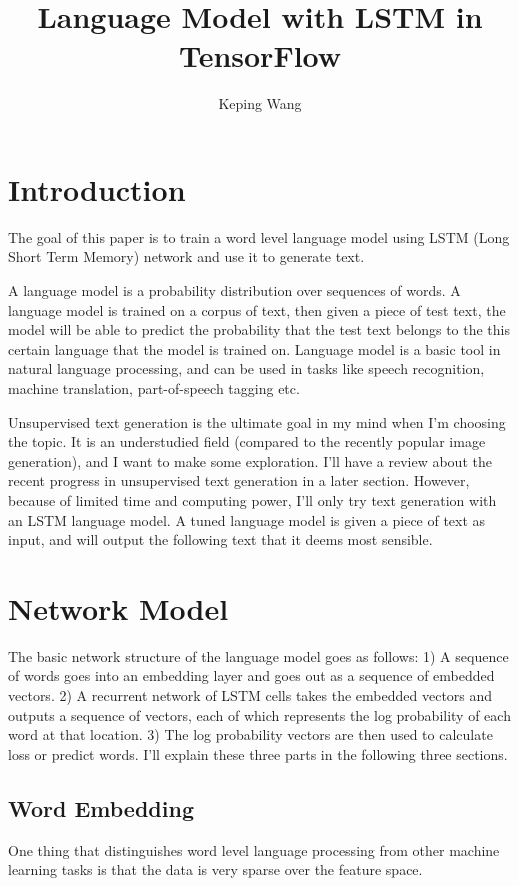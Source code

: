 \documentclass[a4paper]{article}
\title{Language Model with LSTM in TensorFlow}
\author{Keping Wang}
\begin{document}
\maketitle

\section{Introduction}
The goal of this paper is to train a word level language model using LSTM (Long Short Term Memory) network and use it to generate text.

A language model is a probability distribution over sequences of words. A language model is trained on a corpus of text, then given a piece of test text, the model will be able to predict the probability that the test text belongs to the this certain language that the model is trained on. Language model is a basic tool in natural language processing, and can be used in tasks like speech recognition, machine translation, part-of-speech tagging etc.

Unsupervised text generation is the ultimate goal in my mind when I'm choosing the topic. It is an understudied field (compared to the recently popular image generation), and I want to make some exploration. I'll have a review about the recent progress in unsupervised text generation in a later section. However, because of limited time and computing power, I'll only try text generation with an LSTM language model. A tuned language model is given a piece of text as input, and will output the following text that it deems most sensible.

\section{Network Model}
The basic network structure of the language model goes as follows: 1) A sequence of words goes into an embedding layer and goes out as a sequence of embedded vectors. 2) A recurrent network of LSTM cells takes the embedded vectors and outputs a sequence of vectors, each of which represents the log probability of each word at that location. 3) The log probability vectors are then used to calculate loss or predict words. I'll explain these three parts in the following three sections.

\subsection{Word Embedding}
One thing that distinguishes word level language processing from other machine learning tasks is that the data is very sparse over the feature space. 
\end{document}
